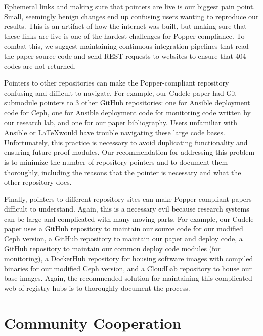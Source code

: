 Ephemeral links and making sure that pointers are live is our biggest pain
point. Small, seemingly benign changes end up confusing users wanting to
reproduce our results. This is an artifact of how the internet was built, but
making sure that these links are live is one of the hardest challenges for
Popper-compliance. To combat this, we suggest maintaining continuous
integration pipelines that read the paper source code and send REST requests to
websites to ensure that 404 codes are not returned.

Pointers to other repositories can make the Popper-compliant repository
confusing and difficult to navigate. For example, our Cudele paper had Git
submodule pointers to 3 other GitHub repositories: one for Ansible deployment
code for Ceph, one for Ansible deployment code for monitoring code written by
our research lab, and one for our paper bibliography. Users unfamiliar with
Ansible or \LaTeX would have trouble navigating these large code bases.
Unfortunately, this practice is necessary to avoid duplicating functionality
and ensuring future-proof modules. Our recommendation for addressing this
problem is to minimize the number of repository pointers and to document them
thoroughly, including the reasons that the pointer is necessary and what the
other repository does.

Finally, pointers to different repository sites can make Popper-compliant
papers difficult to understand. Again, this is a necessary evil because
research systems can be large and complicated with many moving parts. For
example, our Cudele paper uses a GitHub repository to maintain our source code
for our modified Ceph version, a GitHub repository to maintain our paper and
deploy code, a GitHub repository to maintain our common deploy code modules
(for monitoring), a DockerHub repository for housing software images with
compiled binaries for our modified Ceph version, and a CloudLab repository to
house our base images. Again, the recommended solution for maintaining this
complicated web of registry hubs is to thoroughly document the process.


\section{Community Cooperation}
\label{sec:community-cooperation}

